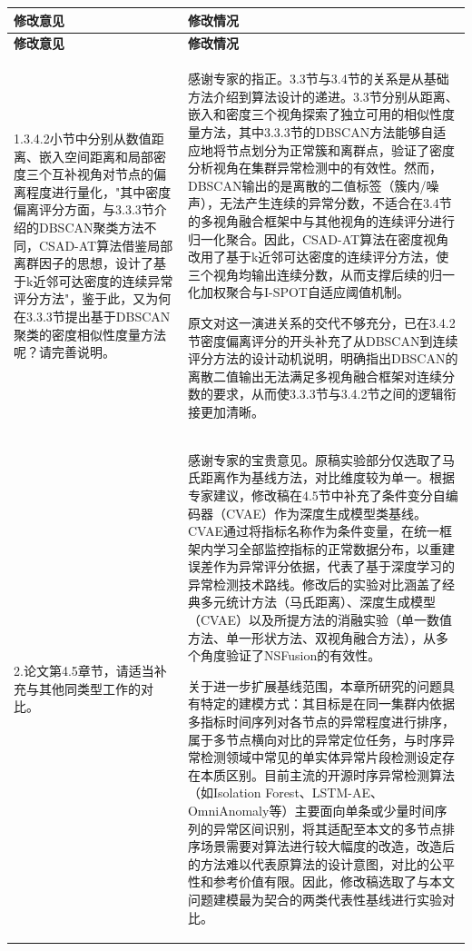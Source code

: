 \documentclass[12pt,a4paper]{article}
\begin{document}
\vspace{10pt}

\vspace{4pt}

\begin{longtable}{|p{}|p{}|}
\hline
\centering\bfseries 修改意见 & \centering\arraybackslash\bfseries 修改情况 \\
\hline
\endfirsthead
\hline
\centering\bfseries 修改意见 & \centering\arraybackslash\bfseries 修改情况 \\
\hline
\endhead

1.3.4.2小节中分别从数值距离、嵌入空间距离和局部密度三个互补视角对节点的偏离程度进行量化，"其中密度偏离评分方面，与3.3.3节介绍的DBSCAN聚类方法不同，CSAD-AT算法借鉴局部离群因子的思想，设计了基于k近邻可达密度的连续异常评分方法"，鉴于此，又为何在3.3.3节提出基于DBSCAN聚类的密度相似性度量方法呢？请完善说明。
&
感谢专家的指正。3.3节与3.4节的关系是从基础方法介绍到算法设计的递进。3.3节分别从距离、嵌入和密度三个视角探索了独立可用的相似性度量方法，其中3.3.3节的DBSCAN方法能够自适应地将节点划分为正常簇和离群点，验证了密度分析视角在集群异常检测中的有效性。然而，DBSCAN输出的是离散的二值标签（簇内/噪声），无法产生连续的异常分数，不适合在3.4节的多视角融合框架中与其他视角的连续评分进行归一化聚合。因此，CSAD-AT算法在密度视角改用了基于k近邻可达密度的连续评分方法，使三个视角均输出连续分数，从而支撑后续的归一化加权聚合与I-SPOT自适应阈值机制。

原文对这一演进关系的交代不够充分，已在3.4.2节密度偏离评分的开头补充了从DBSCAN到连续评分方法的设计动机说明，明确指出DBSCAN的离散二值输出无法满足多视角融合框架对连续分数的要求，从而使3.3.3节与3.4.2节之间的逻辑衔接更加清晰。
\\
\hline

2.论文第4.5章节，请适当补充与其他同类型工作的对比。
&
感谢专家的宝贵意见。原稿实验部分仅选取了马氏距离作为基线方法，对比维度较为单一。根据专家建议，修改稿在4.5节中补充了条件变分自编码器（CVAE）作为深度生成模型类基线。CVAE通过将指标名称作为条件变量，在统一框架内学习全部监控指标的正常数据分布，以重建误差作为异常评分依据，代表了基于深度学习的异常检测技术路线。修改后的实验对比涵盖了经典多元统计方法（马氏距离）、深度生成模型（CVAE）以及所提方法的消融实验（单一数值方法、单一形状方法、双视角融合方法），从多个角度验证了NSFusion的有效性。

关于进一步扩展基线范围，本章所研究的问题具有特定的建模方式：其目标是在同一集群内依据多指标时间序列对各节点的异常程度进行排序，属于多节点横向对比的异常定位任务，与时序异常检测领域中常见的单实体异常片段检测设定存在本质区别。目前主流的开源时序异常检测算法（如Isolation Forest、LSTM-AE、OmniAnomaly等）主要面向单条或少量时间序列的异常区间识别，将其适配至本文的多节点排序场景需要对算法进行较大幅度的改造，改造后的方法难以代表原算法的设计意图，对比的公平性和参考价值有限。因此，修改稿选取了与本文问题建模最为契合的两类代表性基线进行实验对比。


\end{longtable}
\end{document}
